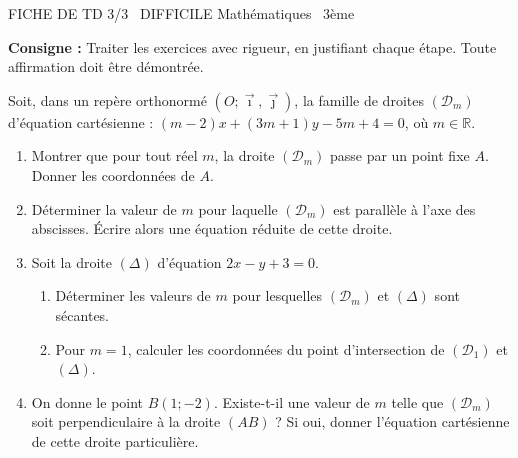 \documentclass[11pt]{article}
\begin{document}
\begin{tcolorbox}[enhanced,colback=popink,colframe=popink,arc=10pt,boxrule=0pt,left=12pt,right=12pt,top=9pt,bottom=9pt]
{\color{white}\popxbold\small FICHE DE TD 3/3 \textbullet\ DIFFICILE \hfill Mathématiques \textbullet\ 3ème\par}
\end{tcolorbox}
\vspace{4pt}
\noindent \textbf{Consigne :} Traiter les exercices avec rigueur, en justifiant chaque étape. Toute affirmation doit être démontrée.

\begin{exercice}
Soit, dans un repère orthonormé $(O;\vec{\imath},\vec{\jmath})$, la famille de droites $(\mathcal{D}_m)$ d'équation cartésienne : $(m-2)x + (3m+1)y - 5m + 4 = 0$, où $m \in \mathbb{R}$.
\begin{enumerate}
    \item Montrer que pour tout réel $m$, la droite $(\mathcal{D}_m)$ passe par un point fixe $A$. Donner les coordonnées de $A$.
    \item Déterminer la valeur de $m$ pour laquelle $(\mathcal{D}_m)$ est parallèle à l'axe des abscisses. Écrire alors une équation réduite de cette droite.
    \item Soit la droite $(\Delta)$ d'équation $2x - y + 3 = 0$.
    \begin{enumerate}
        \item Déterminer les valeurs de $m$ pour lesquelles $(\mathcal{D}_m)$ et $(\Delta)$ sont sécantes.
        \item Pour $m = 1$, calculer les coordonnées du point d'intersection de $(\mathcal{D}_1)$ et $(\Delta)$.
    \end{enumerate}
    \item On donne le point $B(1; -2)$. Existe-t-il une valeur de $m$ telle que $(\mathcal{D}_m)$ soit perpendiculaire à la droite $(AB)$ ? Si oui, donner l'équation cartésienne de cette droite particulière.
\end{enumerate}
\end{exercice}
\end{document}
